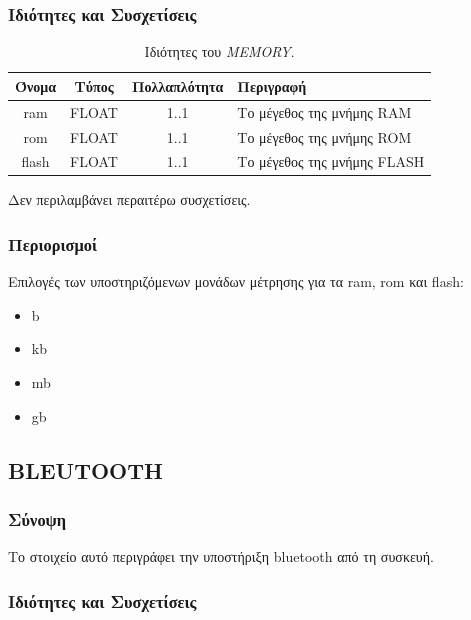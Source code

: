 \subsubsection*{Ιδιότητες και Συσχετίσεις}

\begin{table}[H]
	\begin{center}
		\caption{Ιδιότητες του \textit{MEMORY}.}
		\label{tab:memory}
		\begin{tabular}{ | c | c | c| m{5.5cm} | }
			\hline
			\rowcolor{Gray}
			Όνομα & Τύπος & Πολλαπλότητα & Περιγραφή \\
			\hline
			ram & FLOAT & 1..1 & Το μέγεθος της μνήμης RAM \\
			\hline
			rom & FLOAT & 1..1 & Το μέγεθος της μνήμης ROM \\
			\hline
			flash & FLOAT & 1..1 & Το μέγεθος της μνήμης FLASH \\
			\hline
		\end{tabular}
	\end{center}
\end{table}

\noindent Δεν περιλαμβάνει περαιτέρω συσχετίσεις.

\subsubsection*{Περιορισμοί}

\noindent Επιλογές των υποστηριζόμενων μονάδων μέτρησης για τα ram, rom και flash:

\begin{itemize}
	\item b
	\item kb
	\item mb
	\item gb
\end{itemize}

\subsection{BLEUTOOTH}
\label{subsec:bluetooth}

\subsubsection*{Σύνοψη}

\noindent Το στοιχείο αυτό περιγράφει την υποστήριξη bluetooth από τη συσκευή.

\subsubsection*{Ιδιότητες και Συσχετίσεις}

